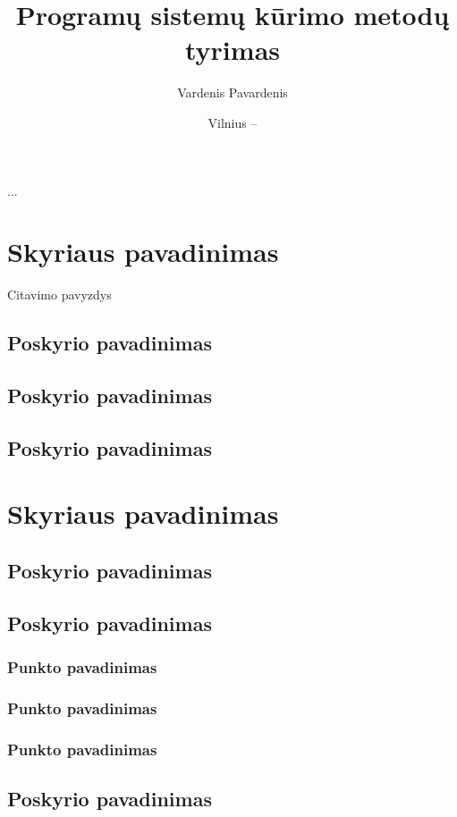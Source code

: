 \documentclass[12pt, a4paper, lithuanian]{article}
\title{Programų sistemų kūrimo metodų tyrimas}
\author{
    Vardenis Pavardenis
}
\date{Vilnius – \the\year}
\begin{document}
\sloppy
\maketitle

\tableofcontents

...

\section{Skyriaus pavadinimas}
Citavimo pavyzdys \cite{Banerjee1997}

\subsection{Poskyrio pavadinimas}
\subsection{Poskyrio pavadinimas}
\subsection{Poskyrio pavadinimas}

\section{Skyriaus pavadinimas}
\subsection{Poskyrio pavadinimas}
\subsection{Poskyrio pavadinimas}
\subsubsection{Punkto pavadinimas}
\subsubsection{Punkto pavadinimas}
\subsubsection{Punkto pavadinimas}
\subsection{Poskyrio pavadinimas}
\end{document}

